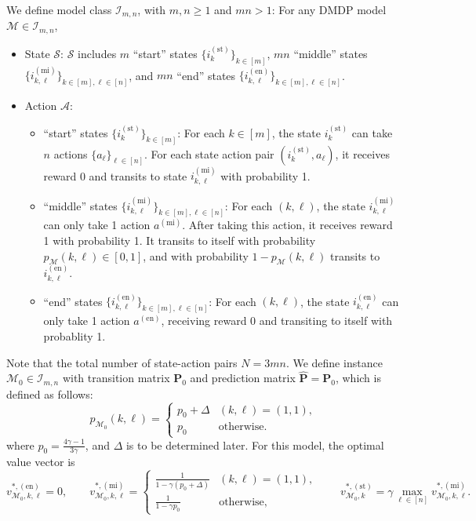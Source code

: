 \documentclass[12pt]{article}
\begin{document}
We define model class $\mathcal{I}_{m,n}$, with $m,n \ge 1$ and $mn > 1$: For any DMDP model $\mathcal{M} \in \mathcal{I}_{m,n}$,
\begin{itemize}
    \item State $\mathcal{S}$: $\mathcal{S}$ includes $m$ ``start'' states $\{i^{(\text{st})}_k\}_{k \in [m]}$, $mn$ ``middle'' states $\{i^{(\text{mi})}_{k,\ell}\}_{k \in [m], \ell \in [n]}$, and $mn$ ``end'' states $\{i^{(\text{en})}_{k,\ell}\}_{k \in [m], \ell \in [n]}$.
    \item Action $\mathcal{A}$: 
    \begin{itemize}
        \item ``start'' states $\{i^{(\text{st})}_k\}_{k \in [m]}$: For each $k \in [m]$, the state $i^{(\text{st})}_k$ can take $n$ actions $\{a_{\ell}\}_{\ell \in [n]}$. For each state action pair $(i^{(\text{st})}_k,a_{\ell})$, it receives reward 0 and transits to state $i^{(\text{mi})}_{k,\ell}$ with probability 1.
        \item ``middle'' states $\{i^{(\text{mi})}_{k,\ell}\}_{k \in [m], \ell \in [n]}$: For each $(k,\ell)$, the state $i^{(\text{mi})}_{k,\ell}$ can only take 1 action $a^{(\text{mi})}$. After taking this action, it receives reward 1 with probability 1. It transits to itself with probability $p_{\mathcal{M}}(k,\ell) \in [0,1]$, and with probability $1 - p_{\mathcal{M}}(k,\ell)$ transits to $i^{(\text{en})}_{k,\ell}$.
        \item ``end'' states $\{i^{(\text{en})}_{k,\ell}\}_{k \in [m], \ell \in [n]}$: For each $(k,\ell)$, the state $i^{(\text{en})}_{k,\ell}$ can only take 1 action $a^{(\text{en})}$, receiving reward 0 and transiting to itself with probablity 1.
    \end{itemize}
\end{itemize}
Note that the total number of state-action pairs $N = 3mn$. We define instance $\mathcal{M}_0 \in \mathcal{I}_{m,n}$ with transition matrix $\boldsymbol{\text{P}}_0$ and prediction matrix $\hat{\boldsymbol{\text{P}}} = \boldsymbol{\text{P}}_0$, which is defined as follows:
\begin{equation*}
    p_{\mathcal{M}_0}(k,\ell) = \begin{cases}
        p_0 + \Delta & (k,\ell) = (1,1), \\
        p_0 & \text{otherwise.}
    \end{cases}
\end{equation*}
where $p_0 = \frac{4 \gamma - 1}{3 \gamma}$, and $\Delta$ is to be determined later. For this model, the optimal value vector is
\begin{equation*}
    v^{*,(\text{en})}_{\mathcal{M}_0,k,\ell} = 0,\qquad v^{*,(\text{mi})}_{\mathcal{M}_0,k,\ell} = \begin{cases}
        \frac{1}{1-\gamma(p_0+\Delta)} & (k,\ell) = (1,1),\\
        \frac{1}{1-\gamma p_0} & \text{otherwise,}   
    \end{cases} \qquad  v^{*,(\text{st})}_{\mathcal{M}_0,k} = \gamma \max_{\ell \in [n]} v^{*,(\text{mi})}_{\mathcal{M}_0,k,\ell} .
\end{equation*}
\end{document}
